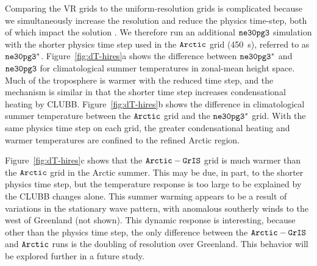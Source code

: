 \documentclass[draft]{agujournal2019}
\begin{document}
Comparing the VR grids to the uniform-resolution grids is complicated because we simultaneously increase the resolution and reduce the physics time-step, both of which impact the solution \cite{W2008TELLUS}. We therefore run an additional $\tt ne30pg3$ simulation with the shorter physics time step used in the $\tt Arctic$ grid (450~s), referred to as $\tt ne30pg3^{*}$. Figure~\ref{fig:dT-hires}a shows the difference between $\tt ne30pg3^{*}$ and $\tt ne30pg3$ for climatological summer temperatures in zonal-mean height space. Much of the troposphere is warmer with the reduced time step, and the mechanism is similar in that the shorter time step increases condensational heating by CLUBB. Figure~\ref{fig:dT-hires}b shows the difference in climatological summer temperature between the $\tt Arctic$ grid and the $\tt ne30pg3^{*}$ grid.  With the same physics time step on each grid, the greater condensational heating and warmer temperatures are confined to the refined Arctic region.

Figure~\ref{fig:dT-hires}c shows that the $\tt Arctic-GrIS$ grid is much warmer than the $\tt Arctic$ grid in the Arctic summer. This may be due, in part, to the shorter physics time step,
but the temperature response is too large to be explained by the CLUBB changes alone. This summer warming appears to be a result of variations in the stationary wave pattern, with anomalous southerly winds to the west of Greenland (not shown). This dynamic response is interesting, because other than the physics time step, the only difference between the $\tt Arctic-GrIS$ and $\tt Arctic$ runs is the doubling of resolution over Greenland. This behavior will be explored further in a future study.
\end{document}
